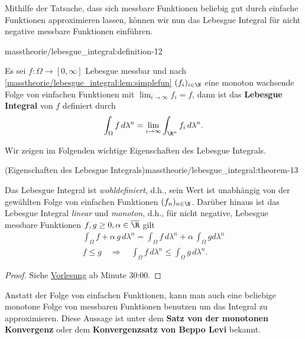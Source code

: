 \documentclass[letterpaper,10pt,german]{jupyterBook}
\begin{document}
\par
Mithilfe der Tatsache, dass sich messbare Funktionen beliebig gut durch einfache Funktionen approximieren lassen, können wir nun das Lebesgue Integral für nicht negative messbare Funktionen einführen.
\begin{definition}{}{masstheorie/lebesgue_integral:definition-12}



\par
Es sei \(f:\Omega\to[0,\infty]\) Lebesgue messbar und nach \cref{masstheorie/lebesgue_integral:lem:simplefun} \((f_i)_{i\in\N}\) eine monoton wachsende Folge von einfachen Funktionen mit \(\lim_{i\to\infty} f_i = f\), dann ist das \textbf{Lebesgue Integral} von \(f\) definiert durch
\begin{align*}
\int_{\Omega} f \,d\lambda^n = \lim_{i\rightarrow \infty} \int_{\R^n} f_i \,d\lambda^n.
\end{align*}\end{definition}

\par
Wir zeigen im Folgenden wichtige Eigenschaften des Lebesgue Integrals.
\begin{theorem}{(Eigenschaften des Lebesgue Integrals)}{masstheorie/lebesgue_integral:theorem-13}



\par
Das Lebesgue Integral ist \emph{wohldefiniert}, d.h., sein Wert ist unabhängig von der gewählten Folge von einfachen Funktionen \((f_n)_{n\in\N}\).
Darüber hinaus ist das Lebesgue Integral \emph{linear} und \emph{monoton}, d.h., für nicht negative, Lebesgue messbare Funktionen \(f,g \geq 0,\alpha\in\overline{\R}\) gilt
\begin{align*}
\int_\Omega f+\alpha\,g\,d\lambda^n = \int_\Omega f\,d\lambda^n + \alpha\, \int_\Omega g d\lambda^n\\
f \leq g \quad \Rightarrow \quad \int_\Omega f\, d\lambda^n \leq \int_\Omega g\, d\lambda^n.
\end{align*}\end{theorem}

\begin{proof}
 Siehe \href{https://www.fau.tv/clip/id/40589}{Vorlesung} ab Minute 30:00.
\end{proof}

\par
Anstatt der Folge von einfachen Funktionen, kann man auch eine beliebige monotone Folge von messbaren Funktionen benutzen um das Integral zu approximieren. Diese Aussage ist unter dem \textbf{Satz von der monotonen Konvergenz} oder dem \textbf{Konvergenzsatz von Beppo Levi} bekannt.
\end{document}
